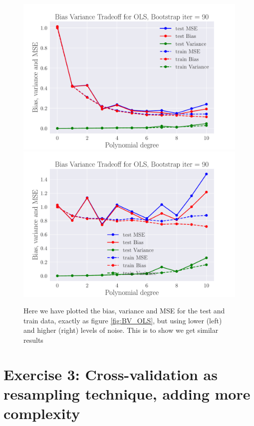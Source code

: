 \documentclass[reprint,english,notitlepage,aps,nobalancelastpage,nofootinbib]{revtex4-1}  %
\begin{document}
\begin{figure}[H]
	\includegraphics[width=\linewidth]{BVT_OLS_n30_eps0_1.pdf}
	\endminipage\hfill
	\includegraphics[width=\linewidth]{BVT_OLS_n30_eps0_5.pdf}
	\endminipage
	\caption{Here we have plotted the bias, variance and MSE for the test and train data, exactly as figure \ref{fig:BV_OLS}, but using lower (left) and higher (right) levels of noise. This is to show we get similar results} \label{fig:BV_OLS_noise}
\end{figure}

\section*{Exercise 3: Cross-validation as resampling technique, adding more complexity}
\end{document}
